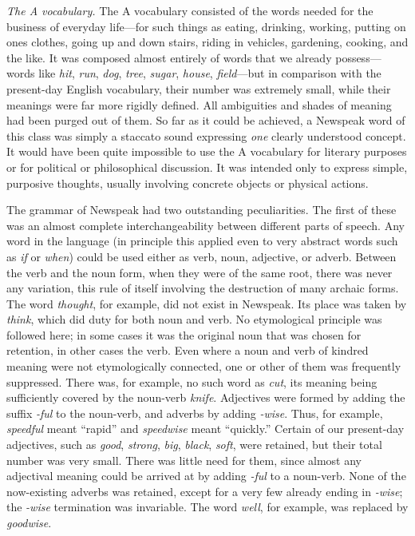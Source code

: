 \emph{The A vocabulary.} The A vocabulary consisted of the words needed
for the business of everyday life---for such things as eating, drinking,
working, putting on one\textquotesingle s clothes, going up and down
stairs, riding in vehicles, gardening, cooking, and the like. It was
composed almost entirely of words that we already possess---words like
\emph{hit}, \emph{run}, \emph{dog}, \emph{tree}, \emph{sugar},
\emph{house}, \emph{field}---but in comparison with the present-day
English vocabulary, their number was extremely small, while their
meanings were far more rigidly defined. All ambiguities and shades of
meaning had been purged out of them. So far as it could be achieved, a
Newspeak word of this class was simply a staccato sound expressing
\emph{one} clearly understood concept. It would have been quite
impossible to use the A vocabulary for literary purposes or for
political or philosophical discussion. It was intended only to express
simple, purposive thoughts, usually involving concrete objects or
physical actions.

The grammar of Newspeak had two outstanding peculiarities. The first of
these was an almost complete interchangeability between different parts
of speech. Any word in the language (in principle this applied even to
very abstract words such as \emph{if} or \emph{when}) could be used
either as verb, noun, adjective, or adverb. Between the verb and the
noun form, when they were of the same root, there was never any
variation, this rule of itself involving the destruction of many archaic
forms. The word \emph{thought}, for example, did not exist in Newspeak.
Its place was taken by \emph{think}, which did duty for both noun and
verb. No etymological principle was followed here; in some cases it was
the original noun that was chosen for retention, in other cases the
verb. Even where a noun and verb of kindred meaning were not
etymologically connected, one or other of them was frequently
suppressed. There was, for example, no such word as \emph{cut}, its
meaning being sufficiently covered by the noun-verb \emph{knife}.
Adjectives were formed by adding the suffix \emph{-ful} to the
noun-verb, and adverbs by adding \emph{-wise}. Thus, for example,
\emph{speedful} meant ``rapid'' and \emph{speedwise} meant ``quickly.''
Certain of our present-day adjectives, such as \emph{good},
\emph{strong}, \emph{big}, \emph{black}, \emph{soft}, were retained, but
their total number was very small. There was little need for them, since
almost any adjectival meaning could be arrived at by adding \emph{-ful}
to a noun-verb. None of the now-existing adverbs was retained, except
for a very few already ending in \emph{-wise}; the \emph{-wise}
termination was invariable. The word \emph{well}, for example, was
replaced by \emph{goodwise}.

